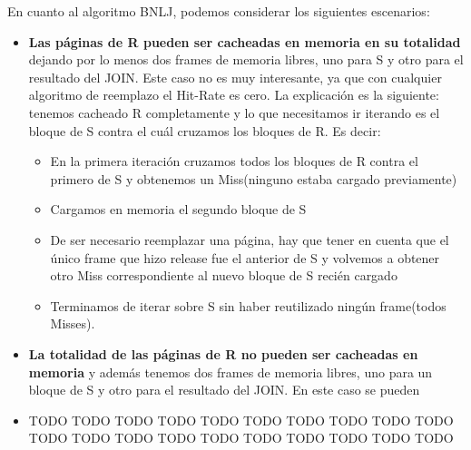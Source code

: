 En cuanto al algoritmo BNLJ, podemos considerar los siguientes escenarios:
\begin{itemize}
  \item \textbf{Las páginas de R pueden ser cacheadas en memoria en su totalidad} dejando por lo menos dos frames de memoria libres, uno para S y otro para el resultado del JOIN. Este caso no es muy interesante, ya que con cualquier algoritmo de reemplazo el Hit-Rate es cero. La explicación es la siguiente: tenemos cacheado R completamente y lo que necesitamos ir iterando es el bloque de S contra el cuál cruzamos los bloques de R. \newline
  Es decir:
  \begin{itemize}
    \item En la primera iteración cruzamos todos los bloques de R contra el primero de S y obtenemos un Miss(ninguno estaba cargado previamente)
    \item Cargamos en memoria el segundo bloque de S
    \item De ser necesario reemplazar una página, hay que tener en cuenta que el único frame que hizo release fue el anterior de S y volvemos a obtener otro Miss correspondiente al nuevo bloque de S recién cargado
    \item Terminamos de iterar sobre S sin haber reutilizado ningún frame(todos Misses).
  \end{itemize}
  \item \textbf{La totalidad de las páginas de R no pueden ser cacheadas en memoria} y además tenemos dos frames de memoria libres, uno para un bloque de S y otro para el resultado del JOIN.\newline
  En este caso se pueden 
  \item TODO TODO TODO TODO TODO TODO TODO TODO TODO TODO TODO TODO TODO TODO TODO TODO TODO TODO TODO TODO 
\end{itemize}

